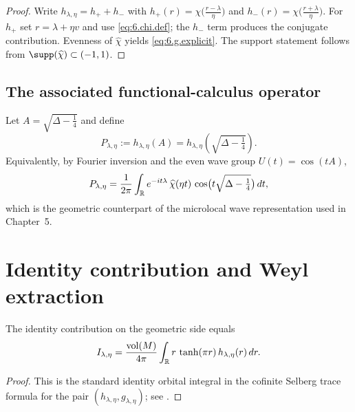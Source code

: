 \begin{proof}
Write $h_{\lambda,\eta}=h_++h_-$ with
$h_+(r)=\chi\!\big(\frac{r-\lambda}{\eta}\big)$ and $h_-(r)=\chi\!\big(\frac{r+\lambda}{\eta}\big)$.
For $h_+$ set $r=\lambda+\eta v$ and use \eqref{eq:6.chi.def}; the $h_-$ term produces the conjugate contribution.
Evenness of $\widehat\chi$ yields \eqref{eq:6.g.explicit}. The support statement follows from
$\supp(\widehat\chi)\subset(-1,1)$.
\end{proof}

\subsection{The associated functional-calculus operator}\label{subsec:ch6-projector}

Let $A=\sqrt{\Delta-\tfrac14}$ and define
\begin{equation}\label{eq:6.projector.fc}
P_{\lambda,\eta}:=h_{\lambda,\eta}(A)=h_{\lambda,\eta}\!\left(\sqrt{\Delta-\tfrac14}\right).
\end{equation}
Equivalently, by Fourier inversion and the even wave group $U(t)=\cos(tA)$,
\begin{equation}\label{eq:6.projector.wave}
P_{\lambda,\eta}
=\frac{1}{2\pi}\int_{\mathbb{R}} e^{-it\lambda}\,\widehat\chi(\eta t)\,
\cos\!\big(t\sqrt{\Delta-\tfrac14}\big)\,dt,
\end{equation}
which is the geometric counterpart of the microlocal wave representation used in Chapter~5.

\section{Identity contribution and Weyl extraction}
\label{sec:ch6-identity}

\begin{lemma}\label{lem:6.identity.exact}
The identity contribution on the geometric side equals
\begin{equation}\label{eq:6.identity.exact}
I_{\lambda,\eta}
=\frac{\mathop{\mathrm{vol}}\nolimits(M)}{4\pi}\int_{\mathbb{R}} r\,\tanh(\pi r)\,h_{\lambda,\eta}(r)\,dr.
\end{equation}
\end{lemma}

\begin{proof}
This is the standard identity orbital integral in the cofinite Selberg trace formula for the pair $(h_{\lambda,\eta},g_{\lambda,\eta})$;
see \cite{Selberg1956,Hejhal1983}.
\end{proof}

